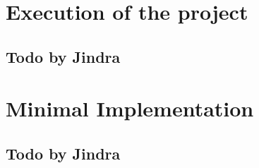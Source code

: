 \chapter{Execution of the project}

\section{Todo by Jindra}

\chapter{Minimal Implementation}

\section{Todo by Jindra}